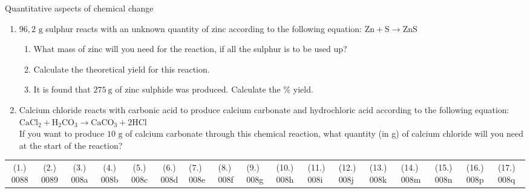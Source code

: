 \begin{eocexercises}{Quantitative aspects of chemical change}
\begin{enumerate}[noitemsep, label=\textbf{\arabic*}. ]
\begin{enumerate}[noitemsep, label=\textbf{\alph*}. ]
 \item The learner then takes $300\phantom{\rule{2pt}{0ex}}{\text{cm}}^{3}$ of a $0,1 \text{ mol} \cdot {\text{dm}}^{-3}$ solution of sulphuric acid ($\text{H}{}_{2}\text{SO}{}_{4}$) and adds it to $200 {\text{ cm}}^{3}$ of a $0,5 \text{ mol} \cdot {\text{dm}}^{-3}$ solution of $\text{NaOH}$ at $25{}^{0}\text{C}$.
 \item Write down a balanced equation for the reaction which takes place when these two solutions are mixed.
 \item Calculate the number of moles of $\text{H}{}_{2}\text{SO}{}_{4}$ which were added to the NaOH solution.
\end{enumerate}
\item $96,2 \text{ g}$ sulphur reacts with an unknown quantity of zinc according to the following equation:
$\text{Zn}+\text{S}\to \text{ZnS}$
 \begin{enumerate}[noitemsep, label=\textbf{\alph*}. ] 
 \item What mass of zinc will you need for the reaction, if all the sulphur is to be used up?
 \item Calculate the theoretical yield for this reaction.
 \item It is found that $275~\text{g}$ of zinc sulphide was produced. Calculate the \% yield.
 \end{enumerate}
\item Calcium chloride reacts with carbonic acid to produce calcium carbonate and hydrochloric acid according to the following equation:\\
${\text{CaCl}}_{2}+{\text{H}}_{2}{\text{CO}}_{3}\to {\text{CaCO}}_{3}+2\text{HCl}$\\
If you want to produce $10 \text{ g}$ of calcium carbonate through this chemical reaction, what quantity (in g) of calcium chloride will you need at the start of the reaction?
                \end{enumerate}
\practiceinfo
\par 
 \par \begin{tabular}[h]{cccccc}
 (1.) 0088  &  (2.) 0089  &  (3.) 008a  &  (4.) 008b  &  (5.) 008c  &  (6.) 008d  &  (7.) 008e  &  (8.) 008f  &  (9.) 008g  &  (10.) 008h  &  (11.) 008i  &  (12.) 008j  &  (13.) 008k  &  (14.) 008m  &  (15.) 008n  & (16.) 008p & (17.) 008q \end{tabular}
\end{eocexercises}
